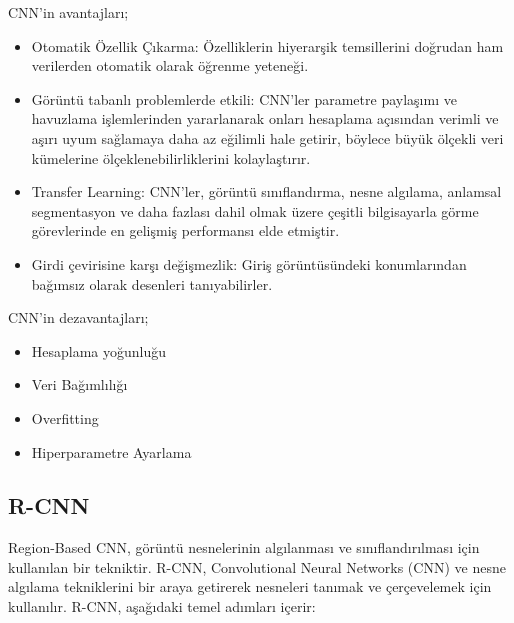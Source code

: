 CNN'in avantajları;
\begin{itemize}
	\item Otomatik Özellik Çıkarma: Özelliklerin hiyerarşik temsillerini doğrudan ham verilerden otomatik olarak öğrenme yeteneği.
	\item Görüntü tabanlı problemlerde etkili: CNN'ler parametre paylaşımı ve havuzlama işlemlerinden yararlanarak onları hesaplama açısından verimli ve aşırı uyum sağlamaya daha az eğilimli hale getirir, böylece büyük ölçekli veri kümelerine ölçeklenebilirliklerini kolaylaştırır.
	\item Transfer Learning: CNN'ler, görüntü sınıflandırma, nesne algılama, anlamsal segmentasyon ve daha fazlası dahil olmak üzere çeşitli bilgisayarla görme görevlerinde en gelişmiş performansı elde etmiştir.
	\item Girdi çevirisine karşı değişmezlik: Giriş görüntüsündeki konumlarından bağımsız olarak desenleri tanıyabilirler.
\end{itemize}

CNN'in dezavantajları;
\begin{itemize}
	\item Hesaplama yoğunluğu
	\item Veri Bağımlılığı
	\item Overfitting
	\item Hiperparametre Ayarlama
\end{itemize}

\subsection{R-CNN}
Region-Based CNN, görüntü nesnelerinin algılanması ve sınıflandırılması için kullanılan bir tekniktir. R-CNN, Convolutional Neural Networks (CNN) ve nesne algılama tekniklerini bir araya getirerek nesneleri tanımak ve çerçevelemek için kullanılır. R-CNN, aşağıdaki temel adımları içerir:

